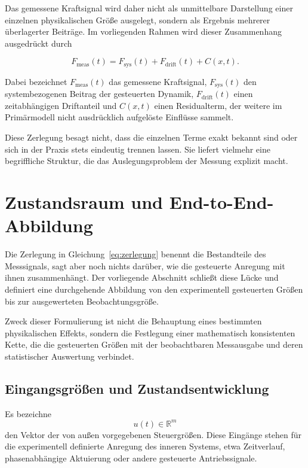 \documentclass[12pt,a4paper]{report}
\begin{document}
Das gemessene Kraftsignal wird daher nicht als unmittelbare Darstellung
einer einzelnen physikalischen Größe ausgelegt, sondern als Ergebnis
mehrerer überlagerter Beiträge. Im vorliegenden Rahmen wird dieser
Zusammenhang ausgedrückt durch

\begin{equation}
F_{\text{meas}}(t) = F_{\text{sys}}(t) + F_{\text{drift}}(t) + C(x,t).
\label{eq:zerlegung}
\end{equation}

Dabei bezeichnet $F_{\text{meas}}(t)$ das gemessene Kraftsignal,
$F_{\text{sys}}(t)$ den systembezogenen Beitrag der gesteuerten Dynamik,
$F_{\text{drift}}(t)$ einen zeitabhängigen Driftanteil und $C(x,t)$ einen
Residualterm, der weitere im Primärmodell nicht ausdrücklich aufgelöste
Einflüsse sammelt.

Diese Zerlegung besagt nicht, dass die einzelnen Terme exakt bekannt sind
oder sich in der Praxis stets eindeutig trennen lassen. Sie liefert
vielmehr eine begriffliche Struktur, die das Auslegungsproblem der
Messung explizit macht.

\section{Zustandsraum und End-to-End-Abbildung}
\label{sec:endtoend}

Die Zerlegung in Gleichung~\eqref{eq:zerlegung} benennt die Bestandteile
des Messsignals, sagt aber noch nichts darüber, wie die gesteuerte
Anregung mit ihnen zusammenhängt. Der vorliegende Abschnitt schließt
diese Lücke und definiert eine durchgehende Abbildung von den
experimentell gesteuerten Größen bis zur ausgewerteten Beobachtungsgröße.

Zweck dieser Formulierung ist nicht die Behauptung eines bestimmten
physikalischen Effekts, sondern die Festlegung einer mathematisch
konsistenten Kette, die die gesteuerten Größen mit der beobachtbaren
Messausgabe und deren statistischer Auswertung verbindet.

\subsection{Eingangsgrößen und Zustandsentwicklung}

Es bezeichne
\[
u(t) \in \mathbb{R}^{m}
\]
den Vektor der von außen vorgegebenen Steuergrößen. Diese Eingänge stehen
für die experimentell definierte Anregung des inneren Systems, etwa
Zeitverlauf, phasenabhängige Aktuierung oder andere gesteuerte
Antriebssignale.
\end{document}
